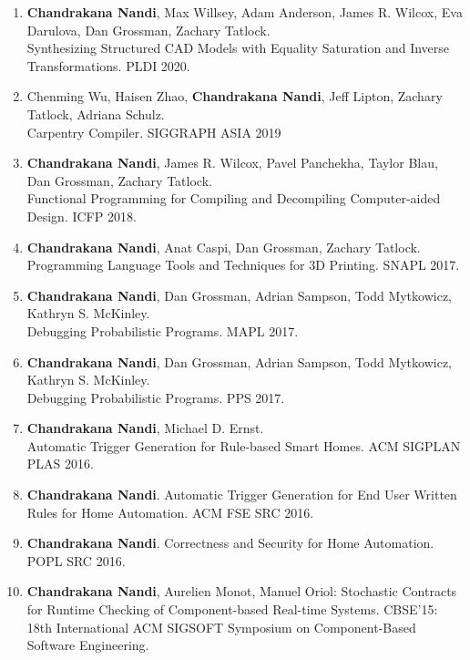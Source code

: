 \documentclass[margin, 10pt]{res} %
\begin{document}
\begin{resume}
\begin{enumerate}
  \item \textbf{Chandrakana Nandi}, Max Willsey, Adam Anderson, James R. Wilcox, Eva Darulova, Dan Grossman, Zachary Tatlock. \\
    Synthesizing Structured CAD Models with Equality Saturation and Inverse Transformations. PLDI 2020.
  \item Chenming Wu, Haisen Zhao, \textbf{Chandrakana Nandi}, Jeff Lipton, Zachary Tatlock, Adriana Schulz. \\
    Carpentry Compiler. SIGGRAPH ASIA 2019

  \item \textbf{Chandrakana Nandi}, James R. Wilcox, Pavel Panchekha, Taylor Blau, Dan Grossman, Zachary Tatlock. \\
    Functional Programming for Compiling and Decompiling Computer-aided Design. ICFP 2018.
  \item \textbf{Chandrakana Nandi}, Anat Caspi, Dan Grossman, Zachary Tatlock. \\
    Programming Language Tools and Techniques for 3D Printing. SNAPL 2017.

  \item \textbf{Chandrakana Nandi}, Dan Grossman, Adrian Sampson, Todd Mytkowicz, Kathryn S. McKinley. \\ Debugging Probabilistic Programs. MAPL 2017.
  \item \textbf{Chandrakana Nandi}, Dan Grossman, Adrian Sampson, Todd Mytkowicz, Kathryn S. McKinley. \\ Debugging Probabilistic Programs. PPS 2017.
\item \textbf{Chandrakana Nandi}, Michael D. Ernst. \\ Automatic Trigger Generation for Rule-based Smart Homes. ACM SIGPLAN PLAS 2016.
\item \textbf{Chandrakana Nandi}. Automatic Trigger Generation for End User Written Rules for Home Automation. ACM FSE SRC 2016.
\item \textbf{Chandrakana Nandi}. Correctness and Security for Home Automation. POPL SRC 2016.
\item \textbf{Chandrakana Nandi}, Aurelien Monot, Manuel Oriol: Stochastic Contracts for Runtime Checking of Component-based Real-time Systems. CBSE'15: 18th International ACM SIGSOFT Symposium on Component-Based Software Engineering.
\end{enumerate}

\end{resume}
\end{document}
